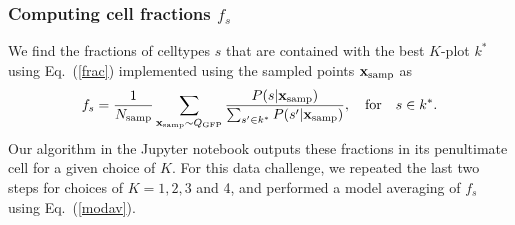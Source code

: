 \documentclass{article}
\newcommand\beq{\begin{equation}}
\newcommand\eeq[1]{\label{#1}\end{equation}}
\newcommand\eqn[1]{Eq.\ (\ref{#1})}
\begin{document}
\subsubsection{Computing cell fractions $f_s$}
We find the fractions of celltypes $s$ that are contained with the
best $K$-plot $k^*$ using
\eqn{frac} implemented using the sampled points $\mathbf{x}_{\rm samp}$ as 
\beq
f_s = \frac{1}{N_{\rm samp}} \sum_{\mathbf{x}_{\rm samp} \sim Q_{\rm GFP}} \frac{P(s|\mathbf{x}_{\rm samp})}{\sum_{s'\in k^*} P(s'|\mathbf{x}_{\rm samp}) },\quad\text{for}\quad s\in k^*.
\eeq{mcfrac}
Our algorithm in the Jupyter notebook outputs these fractions in
its penultimate cell for a given choice of $K$.  For this data
challenge, we repeated the last two steps for choices of $K=1,2,3$
and 4, and performed a model averaging of $f_s$ using \eqn{modav}.
\end{document}
